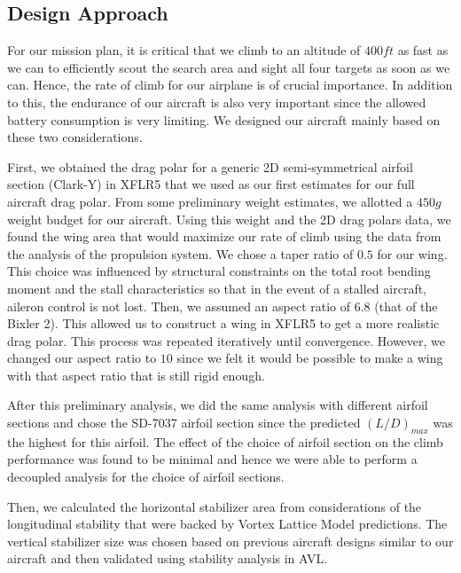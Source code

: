 \documentclass[11pt]{article}
\begin{document}
\subsection{Design Approach}
\label{DsignAppr}

For our mission plan, it is critical that we climb to an altitude of $400 ft$ as fast as we can to efficiently scout the search area and sight all four targets as soon as we can. Hence, the rate of climb for our airplane is of crucial importance. In addition to this, the endurance of our aircraft is also very important since the allowed battery consumption is very limiting. We designed our aircraft mainly based on these two considerations.

First, we obtained the drag polar for a generic 2D semi-symmetrical airfoil section (Clark-Y) in XFLR5 that we used as our first estimates for our full aircraft drag polar. From some preliminary weight estimates, we allotted a $450g$ weight budget for our aircraft. Using this weight and the 2D drag polars data, we found the wing area that would maximize our rate of climb using the data from the analysis of the propulsion system. We chose a taper ratio of $0.5$ for our wing. This choice was influenced by structural constraints on the total root bending moment and the stall characteristics so that in the event of a stalled aircraft, aileron control is not lost. Then, we assumed an aspect ratio of $6.8$ (that of the Bixler 2). This allowed us to construct a wing in XFLR5 to get a more realistic drag polar. This process was repeated iteratively until convergence. However, we changed our aspect ratio to $10$ since we felt it would be possible to make a wing with that aspect ratio that is still rigid enough.

After this preliminary analysis, we did the same analysis with different airfoil sections and chose the SD-7037 airfoil section since the predicted $(L/D)_{max}$ was the highest for this airfoil. The effect of the choice of airfoil section on the climb performance was found to be minimal and hence we were able to perform a decoupled analysis for the choice of airfoil sections.

Then, we calculated the horizontal stabilizer area from considerations of the longitudinal stability that were backed by Vortex Lattice Model predictions. The vertical stabilizer size was chosen based on previous aircraft designs similar to our aircraft and then validated using stability analysis in AVL.
\end{document}

